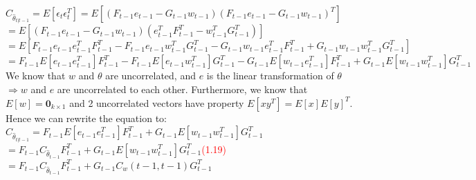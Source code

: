 \documentclass[a4 paper]{article}
\begin{document}
\begin{tcolorbox}[colback=YellowGreen!5!white,colframe=YellowGreen!75!black,title={Problem 6's answer}]
    $C_{\hat{\theta}_{t|t-1}}=E[\epsilon_t\epsilon_t^T]=E[(F_{t-1}e_{t-1}-G_{t-1}w_{t-1})(F_{t-1}e_{t-1}-G_{t-1}w_{t-1})^T]$\newline
    \hspace*{0.5cm}$=E[(F_{t-1}e_{t-1}-G_{t-1}w_{t-1})(e_{t-1}^TF_{t-1}^T-w_{t-1}^TG_{t-1}^T)]$\newline
    \hspace*{0.5cm}$=E[F_{t-1}e_{t-1}e_{t-1}^TF_{t-1}^T-F_{t-1}e_{t-1}w_{t-1}^TG_{t-1}^T-G_{t-1}w_{t-1}e_{t-1}^TF_{t-1}^T+G_{t-1}w_{t-1}w_{t-1}^TG_{t-1}^T]$\newline
    \hspace*{0.5cm}$=F_{t-1}E[e_{t-1}e_{t-1}^T]F_{t-1}^T-F_{t-1}E[e_{t-1}w_{t-1}^T]G_{t-1}^T-G_{t-1}E[w_{t-1}e_{t-1}^T]F_{t-1}^T+G_{t-1}E[w_{t-1}w_{t-1}^T]G_{t-1}^T$\newline
    We know that $w$ and $\theta$ are uncorrelated, and $e$ is the linear transformation of $\theta$\newline
    \hspace*{0.5cm}$\Rightarrow w$ and $e$  are uncorrelated to each other.\newline
    Furthermore, we know that $E[w]=\textbf{0}_{k\times 1}$ and 2 uncorrelated vectors have property $E[xy^T]=E[x]E[y]^T$.\newline
    Hence we can rewrite the equation to:\newline
    $C_{\hat{\theta}_{t|t-1}}=F_{t-1}E[e_{t-1}e_{t-1}^T]F_{t-1}^T+G_{t-1}E[w_{t-1}w_{t-1}^T]G_{t-1}^T$\newline
    \hspace*{0.5cm}$=F_{t-1}C_{\hat{\theta}_{t-1}}F_{t-1}^T+G_{t-1}E[w_{t-1}w_{t-1}^T]G_{t-1}^T$\hspace*{0.3cm}\textcolor{red}{(1.19)}\newline
    \hspace*{0.5cm}$=F_{t-1}C_{\hat{\theta}_{t-1}}F_{t-1}^T+G_{t-1}C_{w}(t-1,t-1)G_{t-1}^T$
\end{tcolorbox}
\end{document}
